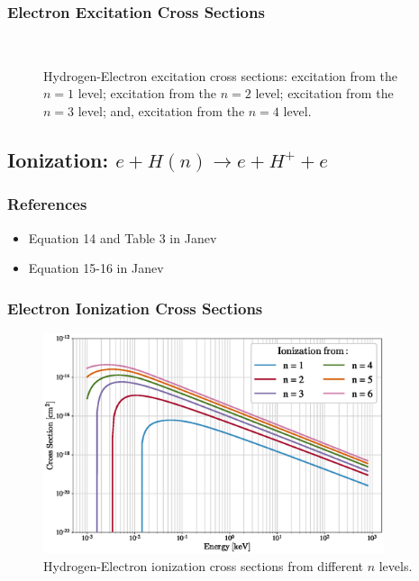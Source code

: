 \subsubsection{Electron Excitation Cross Sections}
\begin{figure}[h!]%
    \centering
    \hspace{8pt}
     \\
    \hspace{8pt}
    \caption{Hydrogen-Electron excitation cross sections:
         excitation from the $n=1$ level;
         excitation from the $n=2$ level;
         excitation from the $n=3$ level; and,
         excitation from the $n=4$ level.}
    \label{fig:H_E_EX}
\end{figure}
\newpage

\subsection{Ionization: $e + H(n) \rightarrow e + H^+ + e$}
\subsubsection{References}
\begin{itemize}
    \item Equation 14 and Table 3 in Janev\cite{janev2003collision}
    \item Equation 15-16 in Janev\cite{janev2003collision}
\end{itemize}
\subsubsection{Electron Ionization Cross Sections}
\begin{figure}[h!]
    \centering
    \includegraphics[width=10cm]{figures/tables/H_e_ioniz.eps}
    \caption{Hydrogen-Electron ionization cross sections from different $n$ levels.}
    \label{fig:H_E_ioniz}
\end{figure}
\newpage

